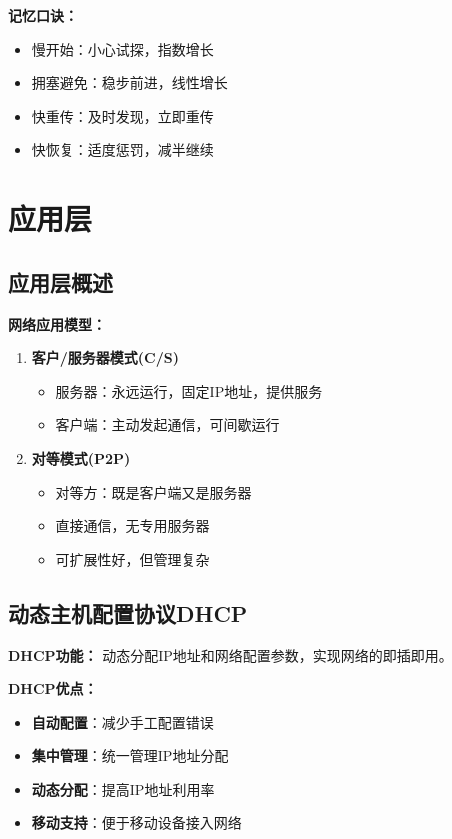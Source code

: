\documentclass[lang=cn,newtx,10pt,scheme=chinese]{../../elegantbook}
\begin{document}
\textbf{记忆口诀：}
\begin{itemize}
  \item 慢开始：小心试探，指数增长
  \item 拥塞避免：稳步前进，线性增长  
  \item 快重传：及时发现，立即重传
  \item 快恢复：适度惩罚，减半继续
\end{itemize}

\chapter{应用层}

\section{应用层概述}

\textbf{网络应用模型：}
\begin{enumerate}
  \item \textbf{客户/服务器模式(C/S)}
    \begin{itemize}
      \item 服务器：永远运行，固定IP地址，提供服务
      \item 客户端：主动发起通信，可间歇运行
    \end{itemize}
  
  \item \textbf{对等模式(P2P)}
    \begin{itemize}
      \item 对等方：既是客户端又是服务器
      \item 直接通信，无专用服务器
      \item 可扩展性好，但管理复杂
    \end{itemize}
\end{enumerate}

\section{动态主机配置协议DHCP}

\textbf{DHCP功能：}
动态分配IP地址和网络配置参数，实现网络的即插即用。

\textbf{DHCP优点：}
\begin{itemize}
  \item \textbf{自动配置}：减少手工配置错误
  \item \textbf{集中管理}：统一管理IP地址分配
  \item \textbf{动态分配}：提高IP地址利用率
  \item \textbf{移动支持}：便于移动设备接入网络
\end{itemize}
\end{document}
